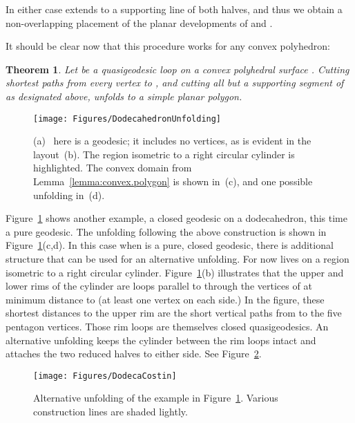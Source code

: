 \pdfoutput=1  \documentclass[]{article}
\newtheorem{theorem}{{\bf Theorem}}
\newcommand{\thmlab}[1]{\label{thm:#1}}
\newcommand{\figlab}[1]{\label{fig:#1}}
\newcommand{\lemref}[1]{\ref{lemma:#1}}
\newcommand{\figref}[1]{\ref{fig:#1}}
\begin{document}
\noindent
In either case  extends to a supporting line
of both halves, and thus we obtain
a non-overlapping placement of the
planar developments of  and .



It should be clear now that this procedure works for any convex polyhedron:
\begin{theorem}
Let  be a quasigeodesic loop on a convex polyhedral surface .
Cutting shortest paths from every vertex to , and cutting all but
a supporting segment  of  as designated above,
unfolds  to a simple planar polygon.
\thmlab{main}
\end{theorem}

\begin{figure}[htbp]
\centering
\texttt{[image: Figures/DodecahedronUnfolding]}
\caption{(a)~ here is a geodesic; it includes no vertices, as is
evident in the layout~(b).
The region isometric to a right
circular cylinder is highlighted.
The convex domain 
from Lemma~\protect\lemref{convex.polygon}
is shown in~(c),
and one possible unfolding in~(d).
}
\figlab{DodecahedronUnfolding}
\end{figure}



Figure~\figref{DodecahedronUnfolding} shows another
example, a closed geodesic on a dodecahedron, this time a pure geodesic.
The unfolding following the above construction is shown
in Figure~\figref{DodecahedronUnfolding}(c,d).
In this case when
 is a pure, closed geodesic, there is additional structure that
can be used for an alternative unfolding.
For now 
lives on a region isometric to a right
circular cylinder. 
Figure~\figref{DodecahedronUnfolding}(b)
illustrates that
the upper and lower rims of the cylinder are loops
parallel to  through the vertices of  at minimum distance
to  (at least one vertex on each side.) 
In the figure, these
shortest distances to the upper rim are the short vertical paths from 
to the five pentagon vertices.
Those rim loops are themselves
closed quasigeodesics.
An alternative unfolding keeps the cylinder between the rim loops intact
and attaches the two reduced halves to either side.
See Figure~\figref{DodecaCostin}.
\begin{figure}[htbp]
\centering
\texttt{[image: Figures/DodecaCostin]}
\caption{Alternative unfolding of the example in
Figure~\protect\figref{DodecahedronUnfolding}.
Various construction lines are shaded lightly.
}
\figlab{DodecaCostin}
\end{figure}
\end{document}
